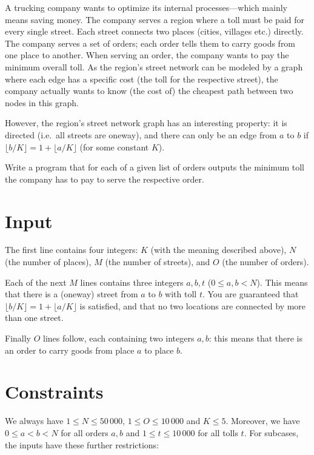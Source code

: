 
\noindent
A trucking company wants to optimize its internal processes---which mainly means saving money. The company serves a region where a toll must be paid for every single street.  Each street connects two places (cities, villages etc.) directly.  The company serves a set of orders; each order tells them to carry goods from one place to another.  When serving an order, the company wants to pay the minimum overall toll.  As the region's street network can be modeled by a graph where each edge has a specific cost (the toll for the respective street), the company actually wants to know (the cost of) the cheapest path between two nodes in this graph.

However, the region's street network graph has an interesting property: it is directed (i.e.~all streets are oneway), and there can only be an edge from $a$ to $b$ if $\lfloor b/K\rfloor = 1 + \lfloor a/K\rfloor$ (for some constant $K$).

Write a program that for each of a given list of orders outputs the minimum toll the company has to pay to serve the respective order.

\section*{Input}

The first line contains four integers: $K$ (with the meaning described above), $N$ (the number of places), $M$ (the number of streets), and $O$ (the number of orders).

Each of the next $M$ lines contains three integers $a,b,t$ ($0 \leq a, b < N$). This means that there is a (oneway) street from $a$ to $b$ with toll $t$. You are guaranteed that $\lfloor b/K\rfloor = 1 + \lfloor a/K\rfloor$ is satisfied, and that no two locations are connected by more than one street.

Finally $O$ lines follow, each containing two integers $a,b$: this means that there is an order to carry goods from place $a$ to place $b$.

\section*{Constraints}
We always have $1 \leq N \leq 50\,000$, $1 \leq O \leq 10\,000$ and $K\leq 5$. Moreover, we have $0 \leq a < b < N$ for all orders $a,b$ and $1 \leq t \leq 10\,000$ for all tolls $t$. For subcases, the inputs have these further restrictions:

